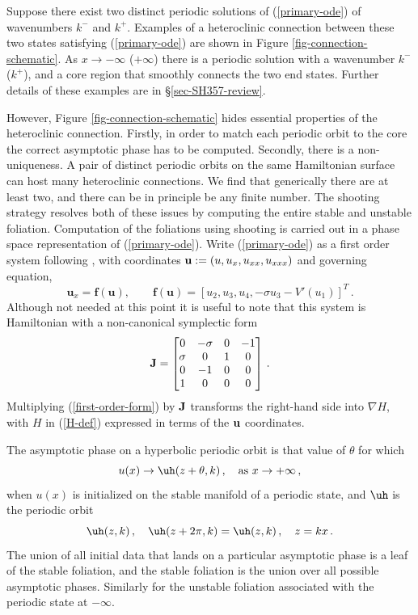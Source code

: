 \documentclass[10pt]{article}
\begin{document}
Suppose there exist two distinct periodic solutions of (\ref{primary-ode}) of
wavenumbers $k^-$ and $k^+$. Examples of a heteroclinic connection between
these two states satisfying (\ref{primary-ode}) are shown in Figure
\ref{fig-connection-schematic}. As $x\to-\infty$ ($+\infty$) there is a periodic
solution with a wavenumber $k^{-}$ ($k^+$), and a core region that smoothly
connects the two end states. Further details of these examples are in \S\ref{sec-SH357-review}.

However, Figure \ref{fig-connection-schematic} hides essential properties of the
heteroclinic connection.  Firstly, in order to match each periodic orbit to the
core the correct asymptotic phase has to be computed. Secondly, there is a
non-uniqueness. A pair of distinct periodic orbits on the same Hamiltonian
surface can host many heteroclinic connections. We find that generically there
are at least two, and there can be in principle be any finite number.  The
shooting strategy resolves both of these issues by computing the entire stable
and unstable foliation. Computation of the foliations using shooting is carried
out in a phase space representation of (\ref{primary-ode}). Write
(\ref{primary-ode}) as a first order system following \cite{bgbk21}, with
coordinates ${\bf u}:= (u,u_x,u_{xx},u_{xxx})$ and governing equation,
%
\begin{equation}\label{first-order-form}
\mathbf{u}_x = \mathbf{f}(\mathbf{u}),\qquad \mathbf{f}(\mathbf{u}) = [u_2,u_3,u_4,-\sigma u_3 - V'(u_1)]^T\,.
\end{equation}
%
Although not needed at this point it is useful to note that this system is
Hamiltonian with a non-canonical symplectic form
%
\begin{equation}\label{J-def}
  {\bf J} = \left[\begin{matrix} 0 & -\sigma & 0 & -1\\
      \sigma & 0 & 1 & 0 \\ 0 & -1 & 0 & 0 \\ 1 & 0 & 0 & 0 \end{matrix}
    \right]\,.
\end{equation}
%
Multiplying (\ref{first-order-form}) by ${\bf J}$ transforms the right-hand side
into $\nabla H$, with $H$ in (\ref{H-def}) expressed in terms of the
${\bf u}$ coordinates.  

The asymptotic phase on a hyperbolic periodic orbit is that value of $\theta$
for which
%
\begin{equation}\label{asymp-phase}
u(x) \to \uh(z+\theta,k)\,,\quad \mbox{as}\ x\to+\infty\,,
\end{equation}
when $u(x)$ is initialized on the stable manifold of a periodic state, and $\uh$
is the periodic orbit
%
\begin{equation}\label{u-per-orbit}
  \uh(z,k)\,,\quad \uh(z+2\pi,k)=\uh(z,k)\,,\quad z=kx\,.
\end{equation}
%
The union of all initial data that lands on a particular asymptotic phase is a
leaf of the stable foliation, and the stable foliation is the union over all
possible asymptotic phases. Similarly for the unstable foliation associated with
the periodic state at $-\infty$.
\end{document}
